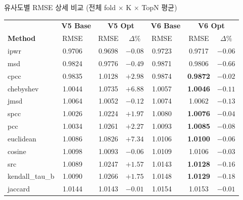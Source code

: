 \documentclass[aspectratio=169,10pt]{beamer}
\begin{document}
\begin{frame}[shrink=12]{유사도별 RMSE 상세 비교 \textnormal{\small(전체 fold $\times$ K $\times$ TopN 평균)}}
	\renewcommand{\arraystretch}{1.15}
	\begin{center}
	\begin{tabular}{l|cc|cc|cc|cc}
		\toprule
		& \multicolumn{2}{c|}{\textbf{V5 Base}} & \multicolumn{2}{c|}{\textbf{V5 Opt}} & \multicolumn{2}{c|}{\textbf{V6 Base}} & \multicolumn{2}{c}{\textbf{V6 Opt}} \\
		\textbf{Method} & RMSE & & RMSE & $\Delta\%$ & RMSE & & RMSE & $\Delta\%$ \\
		\midrule
		ipwr          & 0.9706 & & 0.9698 & \textcolor{testgreen}{$-0.08$} & 0.9723 & & 0.9717 & \textcolor{testgreen}{$-0.06$} \\
		msd           & 0.9824 & & 0.9776 & \textcolor{testgreen}{$-0.49$} & 0.9871 & & 0.9806 & \textcolor{testgreen}{$-0.66$} \\
		cpcc          & 0.9835 & & 1.0128 & \textcolor{negred}{$+2.98$} & 0.9874 & & \textbf{0.9872} & \textcolor{testgreen}{$-0.02$} \\
		chebyshev     & 1.0044 & & 1.0735 & \textcolor{negred}{$+6.88$} & 1.0057 & & \textbf{1.0046} & \textcolor{testgreen}{$-0.11$} \\
		jmsd          & 1.0064 & & 1.0052 & \textcolor{testgreen}{$-0.12$} & 1.0074 & & 1.0062 & \textcolor{testgreen}{$-0.13$} \\
		spcc          & 1.0026 & & 1.0224 & \textcolor{negred}{$+1.97$} & 1.0080 & & \textbf{1.0076} & \textcolor{testgreen}{$-0.04$} \\
		pcc           & 1.0034 & & 1.0261 & \textcolor{negred}{$+2.27$} & 1.0093 & & \textbf{1.0085} & \textcolor{testgreen}{$-0.08$} \\
		euclidean     & 1.0086 & & 1.0826 & \textcolor{negred}{$+7.34$} & 1.0106 & & \textbf{1.0100} & \textcolor{testgreen}{$-0.06$} \\
		cosine        & 1.0098 & & 1.0093 & \textcolor{testgreen}{$-0.06$} & 1.0109 & & 1.0106 & \textcolor{testgreen}{$-0.03$} \\
		src           & 1.0089 & & 1.0247 & \textcolor{negred}{$+1.57$} & 1.0143 & & \textbf{1.0128} & \textcolor{testgreen}{$-0.16$} \\
		kendall\_tau\_b & 1.0090 & & 1.0266 & \textcolor{negred}{$+1.75$} & 1.0148 & & \textbf{1.0129} & \textcolor{testgreen}{$-0.18$} \\
		jaccard       & 1.0144 & & 1.0143 & \textcolor{testgreen}{$-0.01$} & 1.0154 & & 1.0153 & \textcolor{testgreen}{$-0.01$} \\

\end{tabular}
\end{center}
\end{frame}
\end{document}
